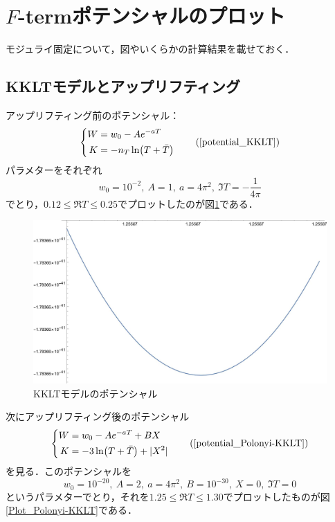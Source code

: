 \documentclass[a4paper,uplatex,dvipdfmx]{jsarticle}
\theoremstyle{definition}
\begin{document}
\section{\texorpdfstring{$F$}{F}-termポテンシャルのプロット}

モジュライ固定について，図やいくらかの計算結果を載せておく．

\subsection*{KKLTモデルとアップリフティング}
\label{Plot_uplifting}

アップリフティング前のポテンシャル：
\begin{equation}
   \left\{
      \begin{alignedat}{1}
         W
         &=
         w_{0}
         -
         Ae^{-aT}
         \\
         K
         &=
         -n_{T}\ln(T+\bar{T})
      \end{alignedat}
   \right.
   \tag*{(\ref{potential_KKLT})}
\end{equation}
パラメターをそれぞれ
\begin{equation}
   w_{0}
   =
   10^{-2}
   ,\ 
   A=1
   ,\ 
   a=4 \pi^2
   ,\ 
   \Im T
   =
   -
   \frac{1}{4\pi}
   \nonumber
\end{equation}
でとり，$0.12\leq\Re T\leq0.25$でプロットしたのが図\ref{Plot_KKLT}である．

\begin{figure}[ht]
   \centering
   \includegraphics[keepaspectratio,width=0.8\linewidth]{fig/kklt_minimum.jpg}   
   \caption{KKLTモデルのポテンシャル}
   \label{Plot_KKLT}
\end{figure}

次にアップリフティング後のポテンシャル
\begin{equation}
   \left\{
      \begin{alignedat}{1}
         W
         &=
         w_{0}
         -
         Ae^{-aT}
         +
         BX
         \\
         K
         &=
         -
         3\ln(T+\bar{T})
         +
         |X^2|
      \end{alignedat}
   \right.
   \tag*{(\ref{potential_Polonyi-KKLT})}
\end{equation}
を見る．このポテンシャルを
\begin{equation}
   w_{0}
   =
   10^{-20}
   ,\ 
   A=2
   ,\ 
   a=4\pi^2
   ,\ 
   B=10^{-30}
   ,\ 
   X=0
   ,\ 
   \Im T
   =
   0
   \nonumber
\end{equation}
というパラメターでとり，それを$1.25\leq\Re T\leq 1.30$でプロットしたものが図\ref{Plot_Polonyi-KKLT}である．
\end{document}
